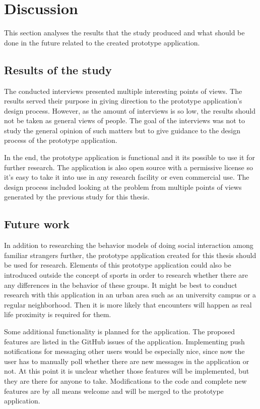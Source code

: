 \section{Discussion}

This section analyses the results that the study produced and what should be done in the future related to the created prototype application.

\subsection{Results of the study}

The conducted interviews presented multiple interesting points of views. The results served their purpose in giving direction to the prototype application's design process. However, as the amount of interviews is so low, the results should not be taken as general views of people. The goal of the interviews was not to study the general opinion of such matters but to give guidance to the design process of the prototype application.

In the end, the prototype application is functional and it its possible to use it for further research. The application is also open source with a permissive license so it's easy to take it into use in any research facility or even commercial use. The design process included looking at the problem from multiple points of views generated by the previous study for this thesis.

\subsection{Future work}

In addition to researching the behavior models of doing social interaction among familiar strangers further, the prototype application created for this thesis should be used for research. Elements of this prototype application could also be introduced outside the concept of sports in order to research whether there are any differences in the behavior of these groups. It might be best to conduct research with this application in an urban area such as an university campus or a regular neighborhood. Then it is more likely that encounters will happen as real life proximity is required for them.

Some additional functionality is planned for the application. The proposed features are listed in the GitHub issues of the application. Implementing push notifications for messaging other users would be especially nice, since now the user has to manually poll whether there are new messages in the application or not. At this point it is unclear whether those features will be implemented, but they are there for anyone to take. Modifications to the code and complete new features are by all means welcome and will be merged to the prototype application.

